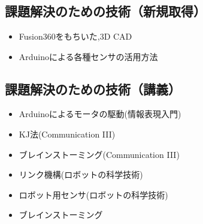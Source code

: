 \appendix
\chapter{}
\section{課題解決のための技術（新規取得）}
      \begin{itemize}
 \item  Fusion360をもちいた,3D CAD
 \item Arduinoによる各種センサの活用方法
      \end{itemize}
\section{課題解決のための技術（講義）}
      \begin{itemize}
 \item Arduinoによるモータの駆動(情報表現入門)
 \item KJ法(Communication I\hspace{-.1em}I\hspace{-.1em}I)
 \item ブレインストーミング(Communication I\hspace{-.1em}I\hspace{-.1em}I)
 \item リンク機構(ロボットの科学技術)
  \item  ロボット用センサ(ロボットの科学技術)

 \item ブレインストーミング
      \end{itemize}
